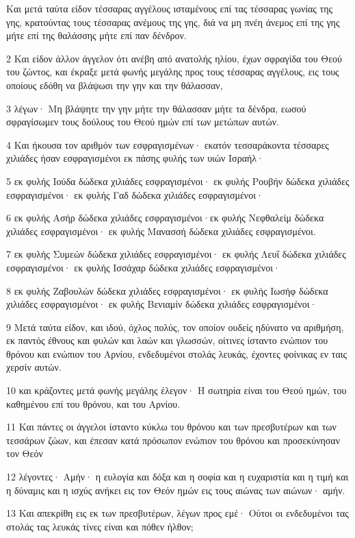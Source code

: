 \par Και μετά ταύτα είδον τέσσαρας αγγέλους ισταμένους επί τας τέσσαρας γωνίας της γης, κρατούντας τους τέσσαρας ανέμους της γης, διά να μη πνέη άνεμος επί της γης μήτε επί της θαλάσσης μήτε επί παν δένδρον.
\par 2 Και είδον άλλον άγγελον ότι ανέβη από ανατολής ηλίου, έχων σφραγίδα του Θεού του ζώντος, και έκραξε μετά φωνής μεγάλης προς τους τέσσαρας αγγέλους, εις τους οποίους εδόθη να βλάψωσι την γην και την θάλασσαν,
\par 3 λέγων· Μη βλάψητε την γην μήτε την θάλασσαν μήτε τα δένδρα, εωσού σφραγίσωμεν τους δούλους του Θεού ημών επί των μετώπων αυτών.
\par 4 Και ήκουσα τον αριθμόν των εσφραγισμένων· εκατόν τεσσαράκοντα τέσσαρες χιλιάδες ήσαν εσφραγισμένοι εκ πάσης φυλής των υιών Ισραήλ·
\par 5 εκ φυλής Ιούδα δώδεκα χιλιάδες εσφραγισμένοι· εκ φυλής Ρουβήν δώδεκα χιλιάδες εσφραγισμένοι· εκ φυλής Γαδ δώδεκα χιλιάδες εσφραγισμένοι·
\par 6 εκ φυλής Ασήρ δώδεκα χιλιάδες εσφραγισμένοι·εκ φυλής Νεφθαλείμ δώδεκα χιλιάδες εσφραγισμένοι· εκ φυλής Μανασσή δώδεκα χιλιάδες εσφραγισμένοι.
\par 7 εκ φυλής Συμεών δώδεκα χιλιάδες εσφραγισμένοι· εκ φυλής Λευΐ δώδεκα χιλιάδες εσφραγισμένοι· εκ φυλής Ισσάχαρ δώδεκα χιλιάδες εσφραγισμένοι·
\par 8 εκ φυλής Ζαβουλών δώδεκα χιλιάδες εσφραγισμένοι· εκ φυλής Ιωσήφ δώδεκα χιλιάδες εσφραγισμένοι· εκ φυλής Βενιαμίν δώδεκα χιλιάδες εσφραγισμένοι·
\par 9 Μετά ταύτα είδον, και ιδού, όχλος πολύς, τον οποίον ουδείς ηδύνατο να αριθμήση, εκ παντός έθνους και φυλών και λαών και γλωσσών, οίτινες ίσταντο ενώπιον του θρόνου και ενώπιον του Αρνίου, ενδεδυμένοι στολάς λευκάς, έχοντες φοίνικας εν ταις χερσίν αυτών.
\par 10 και κράζοντες μετά φωνής μεγάλης έλεγον· Η σωτηρία είναι του Θεού ημών, του καθημένου επί του θρόνου, και του Αρνίου.
\par 11 Και πάντες οι άγγελοι ίσταντο κύκλω του θρόνου και των πρεσβυτέρων και των τεσσάρων ζώων, και έπεσαν κατά πρόσωπον ενώπιον του θρόνου και προσεκύνησαν τον Θεόν
\par 12 λέγοντες· Αμήν· η ευλογία και δόξα και η σοφία και η ευχαριστία και η τιμή και η δύναμις και η ισχύς ανήκει εις τον Θεόν ημών εις τους αιώνας των αιώνων· αμήν.
\par 13 Και απεκρίθη εις εκ των πρεσβυτέρων, λέγων προς εμέ· Ούτοι οι ενδεδυμένοι τας στολάς τας λευκάς τίνες είναι και πόθεν ήλθον;
